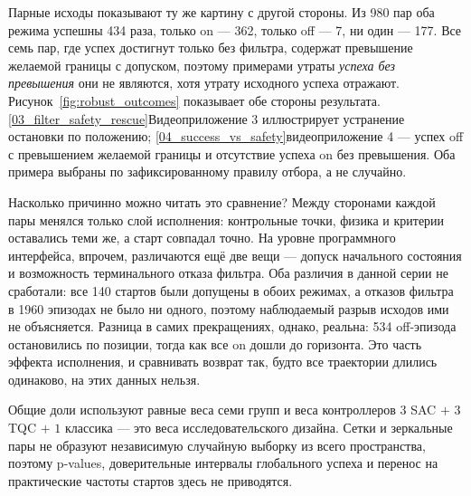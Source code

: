 Парные исходы показывают ту же картину с другой стороны. Из 980 пар оба режима успешны 434 раза, только on — 362, только off — 7, ни один — 177. Все семь пар, где успех достигнут только без фильтра, содержат превышение желаемой границы с допуском, поэтому примерами утраты \emph{успеха без превышения} они не являются, хотя утрату исходного успеха отражают. Рисунок~\ref{fig:robust_outcomes} показывает обе стороны результата.
\vref{03_filter_safety_rescue}{Видеоприложение 3} иллюстрирует устранение остановки по положению;
\vref{04_success_vs_safety}{видеоприложение 4} — успех off с превышением желаемой границы и отсутствие успеха on без превышения. Оба примера выбраны по зафиксированному правилу отбора, а не случайно.

Насколько причинно можно читать это сравнение? Между сторонами каждой пары менялся только слой исполнения: контрольные точки, физика и критерии оставались теми же, а старт совпадал точно. На уровне программного интерфейса, впрочем, различаются ещё две вещи — допуск начального состояния и возможность терминального отказа фильтра. Оба различия в данной серии не сработали: все 140 стартов были допущены в обоих режимах, а отказов фильтра в 1960 эпизодах не было ни одного, поэтому наблюдаемый разрыв исходов ими не объясняется. Разница в самих прекращениях, однако, реальна: 534 off-эпизода остановились по позиции, тогда как все on дошли до горизонта. Это часть эффекта исполнения, и сравнивать возврат так, будто все траектории длились одинаково, на этих данных нельзя.

Общие доли используют равные веса семи групп и веса контроллеров $3$ SAC $+$ $3$ TQC $+$ $1$ классика — это веса исследовательского дизайна. Сетки и зеркальные пары не образуют независимую случайную выборку из всего пространства, поэтому p-values, доверительные интервалы глобального успеха и перенос на практические частоты стартов здесь не приводятся.

